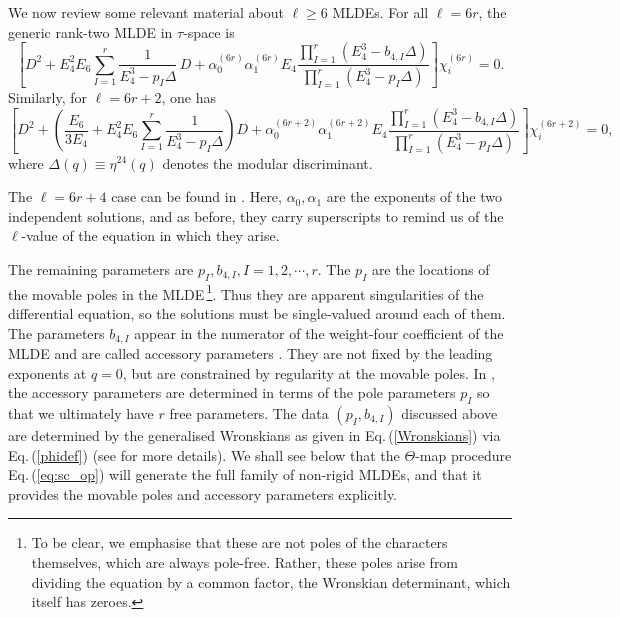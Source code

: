 \documentclass[11pt]{article}
\newcommand{\eref}[1]{Eq.\,(\ref{#1})}
\begin{document}
We now review some relevant material about $\ell\ge 6$ MLDEs.
For all \(\ell=6r\), the generic rank-two MLDE in \(\tau\)-space is
\begin{equation}
    \left[
        D^2
        +
        E_4^2E_6
        \sum_{I=1}^{r}
        \frac{1}{E_4^3-p_I\Delta}\,D
        +
        \alpha_0^{(6r)}\alpha_1^{(6r)} E_4
        \frac{
            \prod_{I=1}^{r}\left(E_4^3-b_{4,I}\Delta\right)
        }{
            \prod_{I=1}^{r}\left(E_4^3-p_I\Delta\right)
        }
    \right]\chi_i^{(6r)}=0 .
    \label{gen_26r_movable_review}
\end{equation}
Similarly, for \(\ell=6r+2\), one has
\begin{equation}
    \left[
        D^2
        +
        \left(
            \frac{E_6}{3E_4}
            +
            E_4^2E_6
            \sum_{I=1}^{r}
            \frac{1}{E_4^3-p_I\Delta}
        \right)D
        +
        \alpha_0^{(6r+2)}\alpha_1^{(6r+2)} E_4
        \frac{
            \prod_{I=1}^{r}\left(E_4^3-b_{4,I}\Delta\right)
        }{
            \prod_{I=1}^{r}\left(E_4^3-p_I\Delta\right)
        }
    \right]\chi_i^{(6r+2)}=0 ,
    \label{gen_26r2_movable_review}
\end{equation}
where $\Delta(q)\equiv\eta^{24}(q)$ denotes the modular discriminant.

The $\ell=6r+4$ case can be found in \cite{Das:2023qns}. Here, $\alpha_0,\alpha_1$ are the exponents of the two independent solutions, and as before, they carry superscripts to remind us of the $\ell$-value of the equation in which they arise. 

The remaining parameters are $p_I, b_{4,I}, I =1,2,\cdots,r$.
The \(p_I\) are the locations of the movable poles in the MLDE\,\footnote{To be clear, we emphasise that these are not poles of the characters themselves, which are always pole-free. Rather, these poles arise from dividing the equation by a common factor, the Wronskian determinant, which itself has zeroes.}. Thus they are apparent singularities of the differential equation, so the solutions must be single-valued around each of them. The parameters \(b_{4,I}\) appear in the numerator of the weight-four coefficient of the MLDE and are called accessory parameters \cite{Das:2023qns}. They are not fixed by the leading exponents at \(q=0\), but are constrained by regularity at the movable poles. In \cite{Das:2023qns}, the accessory parameters are determined in terms of the pole parameters $p_I$ so that we ultimately have $r$ free parameters. The data $(p_I,b_{4,I})$ discussed above are determined by the generalised Wronskians as given in \eref{Wronskians} via \eref{phidef} (see \cite{Das:2023qns} for more details). We shall see below that the $\Theta$-map procedure \eref{eq:sc_op} will generate the full family of non-rigid MLDEs, and that it provides the movable poles and accessory parameters explicitly.
\end{document}
